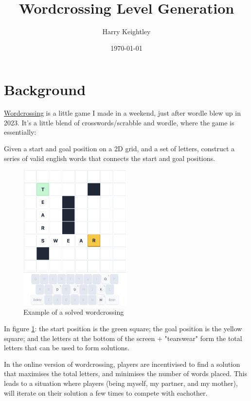 \documentclass{article}
\title{Wordcrossing Level Generation}
\author{Harry Keightley}
\date{\today}
\begin{document}
\maketitle

\section{Background}
\href{https://wordcrossing.com}{Wordcrossing} 
is a little game I made in a weekend, just after wordle blew up in 2023.
It's a little blend of crosswords/scrabble and wordle, where the game is essentially:
\begin{center}
  Given a start and goal position on a 2D grid, and a set of letters, 
  construct a series of valid english words that connects the start and goal positions.
  \vspace{\baselineskip}


\end{center}

\begin{figure}[h]
\centering
\includegraphics[width=0.5\textwidth]{wc-basic.png}
\caption{Example of a solved wordcrossing}
\label{fig:wc-solved}
\end{figure}

In figure \ref{fig:wc-solved}: 
the start position is the green square;
the goal position is the yellow square; 
and the letters at the bottom of the screen + "tearswear" 
form the total letters that can be used to form solutions.

In the online version of wordcrossing, 
players are incentivised to find a solution that maximises the total letters,
and minimises the number of words placed. This leads to a situation where 
players (being myself, my partner, and my mother), will iterate on their 
solution a few times to compete with eachother. 
\end{document}
